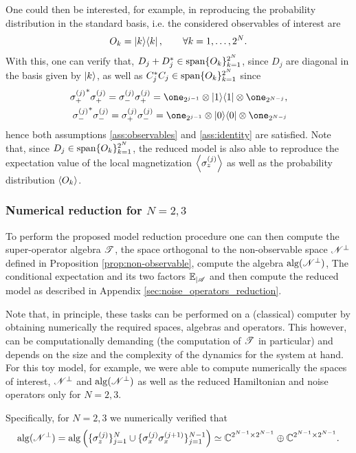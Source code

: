 \documentclass[aihp,12pt]{imsart}
\begin{document}
One could then be interested, for example, in reproducing the probability distribution in the standard basis, i.e. the considered observables of interest are
\[ O_k = \left\vert k \middle>\middle< k \right\vert, \qquad \forall k = 1,\dots,2^{N}.\]
With this, one can verify that, $D_j+D_j^*\in{\rm span}\{O_k\}_{k=1}^{2^N}$, since $D_j$ are diagonal in the basis given by $\left| k \right>$,
as well as $C_j^* C_j\in{\rm span}\{O_k\}_{k=1}^{2^N}$ since 
\begin{align*}
    {\sigma_+^{(j)}}^*\sigma_{+}^{(j)} = \sigma_{-}^{(j)}\sigma_+^{(j)} = \one_{2^{j-1}} \otimes \ketbra{1}{1}\otimes \one_{2^{N-j}},\\ 
    {\sigma_-^{(j)}}^*\sigma_{-}^{(j)} = \sigma_{+}^{(j)}\sigma_-^{(j)} = \one_{2^{j-1}} \otimes \ketbra{0}{0}\otimes \one_{2^{N-j}} 
\end{align*}
hence both assumptions \ref{ass:observables} and \ref{ass:identity} are satisfied. Note that, since $D_j\in{\rm span}\{O_k\}_{k=1}^{2^N}$, the reduced model is also able to reproduce the expectation value of the local magnetization $\left< \sigma_z^{(j)} \right>$ as well as the probability distribution $\left< O_k \right>$. 

\subsubsection{Numerical reduction for $N=2,3$}
To perform the proposed model reduction procedure one can then compute the super-operator algebra $\mathscr{T}$, the space orthogonal to the non-observable space $\mathscr{N}^\perp$ defined in Proposition \ref{prop:non-observable}, compute the algebra ${\rm alg}(\mathscr{N}^\perp)$, The conditional expectation and its two factors $\mathbb{E}_{|\mathscr{A}}$ and then compute the reduced model as described in Appendix \ref{sec:noise_operators_reduction}. 

Note that, in principle, these tasks can be performed on a (classical) computer by obtaining numerically the required spaces, algebras and operators. This however, can be computationally demanding (the computation of $\mathscr{T}$ in particular) and depends on the size and the complexity of the dynamics for the system at hand. 
For this toy model, for example, we were able to compute numerically the spaces of interest, $\mathscr{N}^\perp$ and ${\rm alg}(\mathscr{N}^\perp)$ as well as the reduced Hamiltonian and noise operators only for $N=2,3$. 

Specifically, for $N=2,3$ we numerically verified that
\begin{equation}
    {\rm alg}(\mathscr{N}^\perp) =  {\rm alg}\left(\{ \sigma_z^{(j)}\}_{j=1}^N\cup\{\sigma_x^{(j)}\sigma_x^{(j+1)}\}_{j=1}^{N-1}\right)\simeq \mathbb{C}^{2^{N-1} \times 2^{N-1}} \oplus \mathbb{C}^{2^{N-1} \times 2^{N-1}}.
    \label{eq:example_algebra}
\end{equation}
\end{document}
